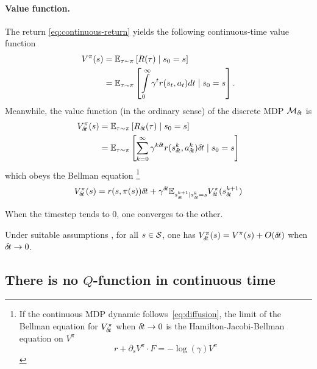\paragraph{Value function.}
The return \eqref{eq:continuous-return} yields the
following continuous-time value function
\begin{align}
  V^\pi(s) &= \mathbb{E}_{\tau\sim\pi}\left[R(\tau) \mid s_0 = s\right]\\
  &= \mathbb{E}_{\tau\sim\pi}\left[\int\limits_{0}^\infty \gamma^{t} r(s_t, a_t) dt \mid s_0 = s\right].
\end{align}
Meanwhile, the value function (in the ordinary sense) of the discrete MDP ${\cal
M}_{\delta\hspace{-.1em}t}$ is
\begin{align}
  V^\pi_{\delta\hspace{-.1em}t}(s) &= \mathbb{E}_{\tau\sim\pi}\left[R_{\delta\hspace{-.1em}t}(\tau) \mid s_0 = s\right]\\
  &= \mathbb{E}_{\tau\sim\pi}\left[\sum\limits_{k=0}^\infty \gamma^{k{\delta\hspace{-.1em}t}}r(s^k_{{\delta\hspace{-.1em}t}}, a^k_{{\delta\hspace{-.1em}t}}){\delta\hspace{-.1em}t} \mid s_0 = s\right]
\end{align}
which obeys the Bellman equation
\footnote{
If the continuous MDP dynamic follows~\eqref{eq:diffusion}, the limit of the Bellman equation for $V^\pi_{\delta\hspace{-.1em}t}$ when ${\delta\hspace{-.1em}t} \rightarrow 0$ is the Hamilton-Jacobi-Bellman equation on $V^\pi$ \cite{cont_rl}
\begin{equation}
  \label{eq:hamilton-jacobi-bellman}
  r + \partial_s V^\pi \cdot F = - \log(\gamma) V^\pi
\end{equation}
}
\begin{equation}
  \label{eq:bellman}
  V^\pi_{\delta\hspace{-.1em}t}(s) = {r}(s, \pi(s)){\delta\hspace{-.1em}t} + \gamma^{{\delta\hspace{-.1em}t}} \mathbb{E}_{s_{{\delta\hspace{-.1em}t}}^{k+1} | s_{{\delta\hspace{-.1em}t}}^{k} = s} V^\pi_{\delta\hspace{-.1em}t}(s_{{\delta\hspace{-.1em}t}}^{k+1})
\end{equation}

When the timestep tends to $0$, one converges to the other.
  \begin{theorem}
    \label{th:conv-value}
   Under suitable assumptions , for all $s \in {\cal
   S}$, one has
      $V^\pi_{\delta\hspace{-.1em}t}(s) = V^\pi(s) + O({\delta\hspace{-.1em}t})$
    when ${\delta\hspace{-.1em}t}\to 0$.
  \end{theorem}

\subsection{There is no $Q$-function in continuous time}

